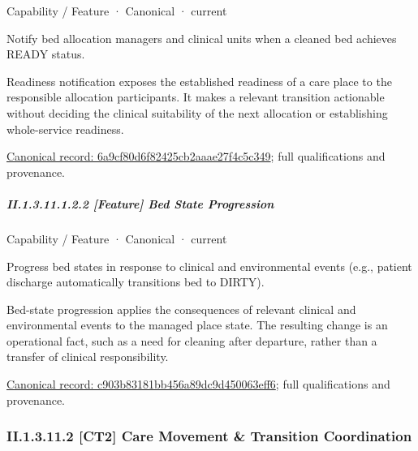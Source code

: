 \label{element:6a9cf80d6f82425cb2aaae27f4c5c349}
{\small Capability / Feature · Canonical · current}\par

Notify bed allocation managers and clinical units when a cleaned bed achieves READY status.



Readiness notification exposes the established readiness of a care place to the responsible allocation participants. It makes a relevant transition actionable without deciding the clinical suitability of the next allocation or establishing whole-service readiness.


{\footnotesize \href{../../../../continuum/strategy/capability/feature/6a9cf80d6f82425cb2aaae27f4c5c349.md}{Canonical record: 6a9cf80d6f82425cb2aaae27f4c5c349}; full qualifications and provenance.}\par
\subparagraph*{II.1.3.11.1.2.2 [Feature] Bed State Progression}
\label{navigation:II.1.3.11.1.2.2}

\label{element:c903b83181bb456a89dc9d450063eff6}
{\small Capability / Feature · Canonical · current}\par

Progress bed states in response to clinical and environmental events (e.g., patient discharge automatically transitions bed to DIRTY).



Bed-state progression applies the consequences of relevant clinical and environmental events to the managed place state. The resulting change is an operational fact, such as a need for cleaning after departure, rather than a transfer of clinical responsibility.


{\footnotesize \href{../../../../continuum/strategy/capability/feature/c903b83181bb456a89dc9d450063eff6.md}{Canonical record: c903b83181bb456a89dc9d450063eff6}; full qualifications and provenance.}\par
\subsubsection*{II.1.3.11.2 [CT2] Care Movement \& Transition Coordination}
\label{navigation:II.1.3.11.2}

